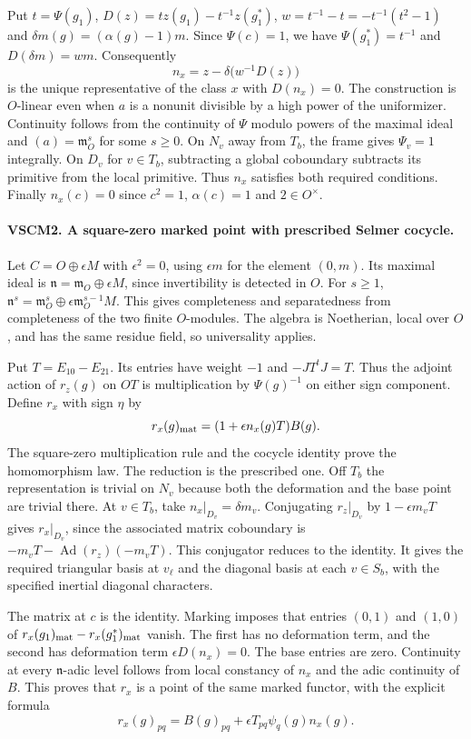Put $t=\Psi(g_1)$, $D(z)=t z(g_1)-t^{-1}z(g_1^*)$,
$w=t^{-1}-t=-t^{-1}(t^2-1)$ and $\delta m(g)=(\alpha(g)-1)m$.
Since $\Psi(c)=1$, we have $\Psi(g_1^*)=t^{-1}$ and
$D(\delta m)=wm$. Consequently
\[
             n_x=z-\delta\bigl(w^{-1}D(z)\bigr)
\]
is the unique representative of the class $x$ with $D(n_x)=0$.
The construction is $O$-linear even when $a$ is a nonunit divisible
by a high power of the uniformizer. Continuity follows from the
continuity of $\Psi$ modulo powers of the maximal ideal and
$(a)=\mathfrak m_O^s$ for some $s\ge0$. On $N_v$ away from
$T_b$, the frame gives $\Psi_v=1$ integrally. On $D_v$ for
$v\in T_b$, subtracting a global coboundary subtracts its primitive
from the local primitive. Thus $n_x$ satisfies both required
conditions. Finally $n_x(c)=0$ since $c^2=1$, $\alpha(c)=1$ and
$2\in O^\times$.

\paragraph{VSCM2. A square-zero marked point with prescribed Selmer cocycle.}
\label{claim:VSCM2}
Let $C=O\oplus\epsilon M$ with $\epsilon^2=0$, using $\epsilon m$
for the element $(0,m)$. Its maximal ideal is
$\mathfrak n=\mathfrak m_O\oplus\epsilon M$, since invertibility is
detected in $O$. For $s\ge1$,
$\mathfrak n^s=\mathfrak m_O^s\oplus\epsilon\mathfrak m_O^{s-1}M$.
This gives completeness and separatedness from completeness of the
two finite $O$-modules. The algebra is Noetherian, local over $O$, and
has the same residue field, so universality applies.

Put $T=E_{10}-E_{21}$. Its entries have weight $-1$ and
$-JT^tJ=T$. Thus the adjoint action of $r_z(g)$ on $OT$ is
multiplication by $\Psi(g)^{-1}$ on either sign component. Define
$r_x$ with sign $\eta$ by
\[
       r_x(g)_{\rm mat}=(1+\epsilon n_x(g)T)B(g).
\]
The square-zero multiplication rule and the cocycle identity prove
the homomorphism law. The reduction is the prescribed one. Off $T_b$
the representation is trivial on $N_v$ because both the deformation
and the base point are trivial there. At $v\in T_b$, take
$n_x|_{D_v}=\delta m_v$. Conjugating $r_z|_{D_v}$ by
$1-\epsilon m_vT$ gives $r_x|_{D_v}$, since the associated matrix
coboundary is $-m_vT-\operatorname{Ad}(r_z)(-m_vT)$. This
conjugator reduces to the identity. It gives the required triangular
basis at $v_\ell$ and the diagonal basis at each $v\in S_b$, with
the specified inertial diagonal characters.

The matrix at $c$ is the identity. Marking imposes that entries
$(0,1)$ and $(1,0)$ of $r_x(g_1)_{\rm mat}-r_x(g_1^*)_{\rm mat}$
vanish. The first has no deformation term, and the second has
deformation term $\epsilon D(n_x)=0$. The base entries are zero.
Continuity at every $\mathfrak n$-adic level follows from local
constancy of $n_x$ and the adic continuity of $B$. This proves that
$r_x$ is a point of the same marked functor, with the explicit formula
\[
     r_x(g)_{pq}=B(g)_{pq}
              +\epsilon T_{pq}\psi_q(g)n_x(g).
\]

